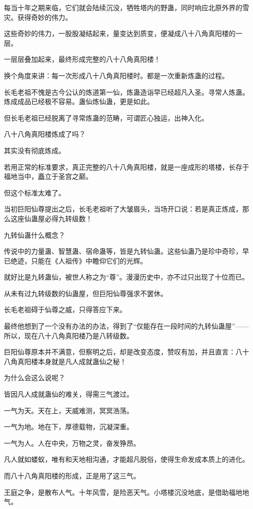 \begin{this_body}
每当十年之期来临，它们就会陆续沉没，牺牲塔内的野蛊，同时响应北原外界的雪灾。获得奇妙的伟力。

这些奇妙的伟力，一股股凝结起来，量变达到质变，便凝成八十八角真阳楼的一层。

一层层叠加起来，最终形成完整的八十八角真阳楼！

换个角度来讲：每一次形成八十八角真阳楼时。都是一次重新炼蛊的过程。

长毛老祖不愧是古今公认的炼道第一仙，炼蛊造诣早已经超凡入圣。寻常人炼蛊。炼成成品已经极不容易。蛊仙炼仙蛊，更是如此。

但长毛老祖已经脱离了寻常炼蛊的范畴，可谓匠心独运，出神入化。

八十八角真阳楼炼成了吗？

其实没有彻底炼成。

若用正常的标准要求，真正完整的八十八角真阳楼，就是一座成形的塔楼，长存于福地当中，矗立于圣宫之巅。

但这个标准太难了。

当初巨阳仙尊提出之后，长毛老祖听了大皱眉头，当场开口说：若是真正炼成，那么这座仙蛊屋必得九转级数！

九转仙蛊什么概念？

传说中的力量蛊、智慧蛊、宿命蛊等，皆是九转仙蛊。这些仙蛊乃是珍中奇珍，早已绝迹，只能在《人祖传》中瞻仰它们的光辉。

就好比是九转蛊仙，被世人称之为“尊”。漫漫历史中，亦不过只出现了十位而已。

从未有过九转级数的仙蛊屋，但巨阳仙尊强求不罢休。

长毛老祖碍于仙尊之威，只得答应下来。

最终他想到了一个没有办法的办法，得到了“仅能存在一段时间的九转仙蛊屋”——所以，现在八十八角真阳楼乃是八转级数。

巨阳仙尊原本并不满意，但察明之后，却是改变态度，赞叹有加，并且直言：八十八角真阳楼本身就是凡人成就蛊仙之秘！

为什么会这么说呢？

皆因凡人成就蛊仙的难关，得需三气渡过。

一气为天。天在上，天威难测，冥冥浩荡。

一气为地。地在下，厚德载物，沉凝深重。

一气为人。人在中央，万物之灵，奋发狰昂。

凡人就如蝼蚁，唯有和天地相沟通，才能超凡脱俗，使得生命发成本质上的进化。

而八十八角真阳楼的形成，正是用了这三气。

王庭之争，是散布人气。十年风雪，是险恶天气。小塔楼沉没地底，是借助福地地气。


\end{this_body}
